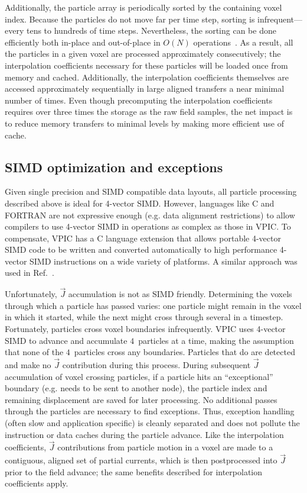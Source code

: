 \documentclass[journal,twoside]{IEEEtran}
\newcommand{\vecJ}{\vec{J}}
\begin{document}
Additionally, the particle array is periodically sorted by the
containing voxel index.  Because the particles do not move far per
time step, sorting is infrequent---every tens to hundreds of time
steps.  Nevertheless, the sorting can be done efficiently both
in-place and out-of-place in $O(N)$ operations~\cite{Bowers_2001}.  As
a result, all the particles in a given voxel are processed
approximately consecutively; the interpolation coefficients necessary
for these particles will be loaded once from memory and cached.
Additionally, the interpolation coefficients themselves are accessed
approximately sequentially in large aligned transfers a near minimal
number of times.  Even though precomputing the interpolation
coefficients requires over three times the storage as the raw field
samples, the net impact is to reduce memory transfers to minimal
levels by making more efficient use of cache.

\subsection{SIMD optimization and exceptions}

Given single precision and SIMD compatible data layouts, all particle
processing described above is ideal for 4-vector SIMD.  However,
languages like C and FORTRAN are not expressive enough (e.g. data
alignment restrictions) to allow compilers to use 4-vector SIMD in
operations as complex as those in VPIC.  To compensate, VPIC has a C
language extension that allows portable 4-vector SIMD code to be
written and converted automatically to high performance 4-vector SIMD
instructions on a wide variety of platforms.  A similar approach was
used in Ref.~\cite{Bowers_et_al_2006}.

Unfortunately, $\vecJ$ accumulation is not as SIMD friendly.
Determining the voxels through which a particle has passed varies: one
particle might remain in the voxel in which it started, while the next
might cross through several in a timestep.  Fortunately, particles
cross voxel boundaries infrequently.  VPIC uses 4-vector SIMD to
advance and accumulate $4$~particles at a time, making the assumption that
none of the
$4$~particles cross any boundaries.  Particles that do are detected
and make no $\vecJ$ contribution during this process.  During
subsequent $\vecJ$ accumulation of voxel crossing particles, if a
particle hits an ``exceptional'' boundary (e.g. needs to be sent to
another node), the particle index and remaining displacement are saved
for later processing.  No additional passes through the particles are
necessary to find exceptions.  Thus, exception handling (often slow
and application specific) is cleanly separated and does not pollute
the instruction or data caches during the particle advance.  Like the
interpolation coefficients, $\vecJ$ contributions from particle motion
in a voxel are made to a contiguous, aligned set of partial currents,
which is then postprocessed into $\vecJ$ prior to the field advance;
the same benefits described for interpolation coefficients apply.
\end{document}
